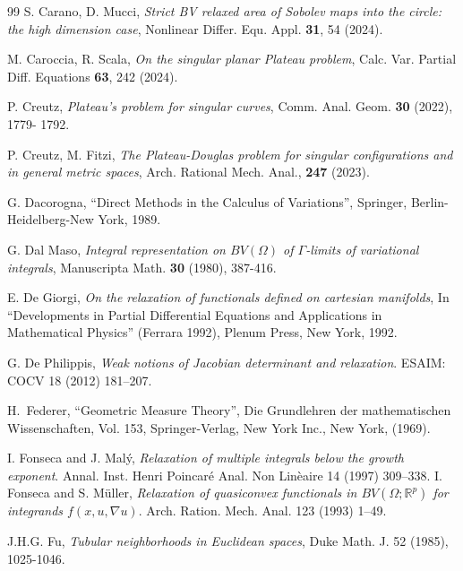 \documentclass[a4paper,11pt]{article}
\numberwithin{equation}{section}
\newcommand{\Om}{\Omega}
\newcommand{\R}{\mathbb{R}}
\begin{document}
\begin{thebibliography}{99}
 S. Carano, D. Mucci, \emph{Strict BV relaxed area of Sobolev maps into the circle: the high dimension case}, Nonlinear Differ. Equ. Appl. \textbf{31}, 54 (2024).

 M. Caroccia, R. Scala, \emph{On the singular planar Plateau problem}, Calc. Var. Partial Diff. Equations \textbf{63}, 242 (2024).


 P. Creutz, 
\emph{Plateau's problem for singular curves}, Comm. Anal. Geom. {\bf 30} (2022), 1779-
1792.

 P. Creutz, M. Fitzi, \emph{The Plateau-Douglas problem for singular configurations and in general metric
	spaces}, Arch. Rational Mech. Anal., {\bf 247} (2023).

G. Dacorogna, ``Direct Methods in the Calculus of Variations'', 
Springer, Berlin-Heidelberg-New York, 1989.

G. Dal Maso,
\emph{Integral representation on $BV(\Omega)$ of $\Gamma$-limits
	of variational integrals},
Manuscripta Math. {\bf 30} (1980), 387-416.

 E. De Giorgi, 
\emph{On the relaxation of functionals defined on cartesian manifolds},
In ``Developments in Partial Differential Equations and Applications
in Mathematical Physics'' (Ferrara 1992),
Plenum Press, New York, 1992.
%


 G. De Philippis, \emph{Weak notions of Jacobian determinant and relaxation}. ESAIM: COCV 18 (2012) 181–207.

{H.~Federer}, {``Geometric Measure Theory''}, 
Die Grundlehren der mathematischen Wissenschaften, Vol. 153, Springer-Verlag, New York Inc., New York, (1969).


 I. Fonseca and J. Mal\'y, \emph{Relaxation of multiple integrals below the growth exponent}. Annal. Inst. Henri Poincar\'e Anal. Non Lin\`eaire 14 (1997) 309--338.
 I. Fonseca and S. M\"uller, \emph{Relaxation of quasiconvex functionals in $BV(\Om;\R^p)$ for integrands $f(x,u,\nabla u)$}. Arch. Ration. Mech. Anal. 123 (1993) 1--49.




J.H.G. Fu, \emph{Tubular neighborhoods in Euclidean spaces}, Duke Math. J. 52 (1985), 1025-1046.


\end{thebibliography}
\end{document}
